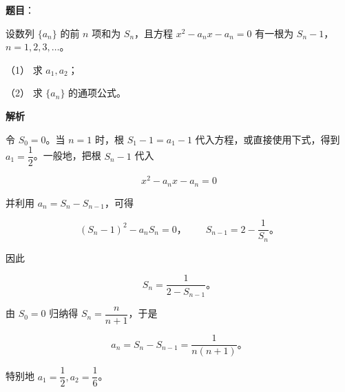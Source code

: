 \begin{answer}

\textbf{题目}：

设数列 $\{a_n\}$ 的前 $n$ 项和为 $S_n$，且方程 $x^2-a_nx-a_n=0$ 有一根为 $S_n-1$，$n=1,2,3,\ldots$。

（1） 求 $a_1,a_2$；

（2） 求 $\{a_n\}$ 的通项公式。

\textbf{解析}


令 $S_0=0$。当 $n=1$ 时，根 $S_1-1=a_1-1$ 代入方程，或直接使用下式，得到 $a_1=\dfrac12$。一般地，把根 $S_n-1$ 代入

\nopagebreak[4]
\[
x^2-a_nx-a_n=0
\]

并利用 $a_n=S_n-S_{n-1}$，可得

\nopagebreak[4]
\[
(S_n-1)^2-a_nS_n=0\text{，}\qquad
S_{n-1}=2-\frac1{S_n}\text{。}
\]

因此

\nopagebreak[4]
\[
S_n=\frac1{2-S_{n-1}}\text{。}
\]

由 $S_0=0$ 归纳得 $S_n=\dfrac n{n+1}$，于是

\nopagebreak[4]
\[
a_n=S_n-S_{n-1}=\frac1{n(n+1)}\text{。}
\]


特别地 $a_1=\dfrac12,a_2=\dfrac16$。



\end{answer}